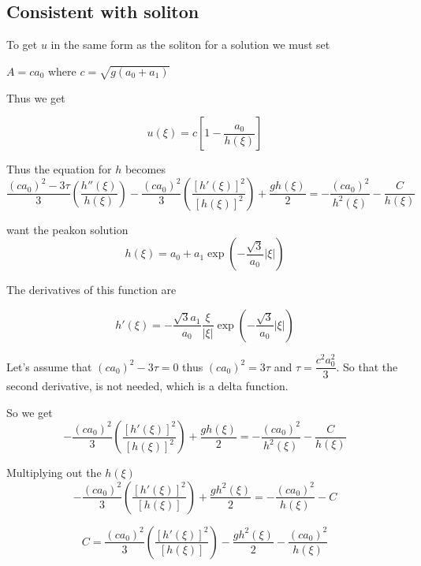 \documentclass[subeqn]{article}
\begin{document}
\subsection{Consistent with soliton}
To get $u$ in the same form as the soliton for a solution we must set 

$A = c a_0$ where $c = \sqrt{g\left(a_0 + a_1\right)}$

Thus we get

\begin{equation}
u(\xi) = c\left[1  - \frac{a_0}{h(\xi)} \right]
\end{equation}

Thus the equation for $h$ becomes
\begin{equation}
\frac{\left(c a_0\right)^2 - 3\tau}{3} \left(\frac{h''\left(\xi\right)}{h\left(\xi\right)} \right)  - \frac{\left(c a_0\right)^2}{3} \left(\frac{ \left[h'(\xi)\right]^2}{\left[h(\xi)\right]^2} \right)  + \frac{gh(\xi)}{2}   =  -\frac{{\left(c a_0\right)^2}}{h^2(\xi)} - \frac{C}{h(\xi)}
\end{equation}

want the peakon solution
\[h\left(\xi\right) = a_0 + a_1 \exp\left(-\frac{\sqrt{3}}{a_0} \left|\xi\right|\right) \]

The derivatives of this function are

\[h'\left(\xi\right) = -\frac{\sqrt{3} a_1}{a_0} \frac{\xi}{\left|\xi\right|} \exp\left(-\frac{\sqrt{3}}{a_0} \left|\xi\right|\right) \]

Let's assume that $\left(c a_0\right)^2 - 3\tau = 0$ thus $\left(c a_0\right)^2  =  3\tau$ and $ \tau = \dfrac{c^2 a_0 ^2}{3}$. So that the second derivative, is not needed, which is a delta function. 


So we get
\begin{equation}
- \frac{\left(c a_0\right)^2}{3} \left(\frac{ \left[h'(\xi)\right]^2}{\left[h(\xi)\right]^2} \right)  + \frac{gh(\xi)}{2}   =  -\frac{{\left(c a_0\right)^2}}{h^2(\xi)} - \frac{C}{h(\xi)}
\end{equation}

Multiplying out the $h\left(\xi\right)$
\begin{equation}
- \frac{\left(c a_0\right)^2}{3} \left(\frac{ \left[h'(\xi)\right]^2}{\left[h(\xi)\right]} \right)  + \frac{gh^2(\xi)}{2}   =  -\frac{{\left(c a_0\right)^2}}{h(\xi)} - C
\end{equation}

\begin{equation}
 C = \frac{\left(c a_0\right)^2}{3} \left(\frac{ \left[h'(\xi)\right]^2}{\left[h(\xi)\right]} \right) - \frac{gh^2(\xi)}{2} - \frac{{\left(c a_0\right)^2}}{h(\xi)}
\end{equation}
\end{document}
